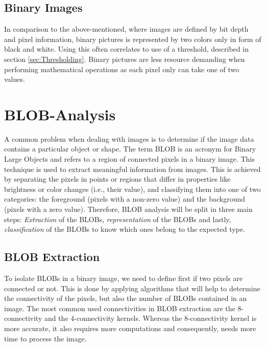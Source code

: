 \subsection{Binary Images}
In comparison to the above-mentioned, where images are defined by bit depth and pixel information, binary pictures is represented by two colors only in form of black and white. Using this often correlates to use of a threshold, described in section \ref{sec:Thresholding}. Binary pictures are less resource demanding when performing mathematical operations as each pixel only can take one of two values.\\


\section{BLOB-Analysis}
A common problem when dealing with images is to determine if the image data contains a particular object or shape. The term BLOB is an acronym for Binary Large Objects and refers to a region of connected pixels in a binary image. This technique is used to extract meaningful information from images. This is achieved by separating the pixels in points or regions that differ in properties like brightness or color changes (i.e., their value), and classifying them into one of two categories: the foreground (pixels with a non-zero value) and the background (pixels with a zero value).
Therefore, BLOB analysis will be split in three main steps: \textit{Extraction} of the BLOBs, \textit{representation} of the BLOBs and lastly, \textit{classification} of the BLOBs to know which ones belong to the expected type.
\subsection{BLOB Extraction}
To isolate BLOBs in a binary image, we need to define first if two pixels are connected or not. This is done by applying algorithms that will help to determine the connectivity of the pixels, but also the number of BLOBs contained in an image. The most common used connectivities in BLOB extraction are the 8-connectivity and the 4-connectivity kernels. Whereas the 8-connectivity kernel is more accurate, it also requires more computations and consequently, needs more time to process the image.

